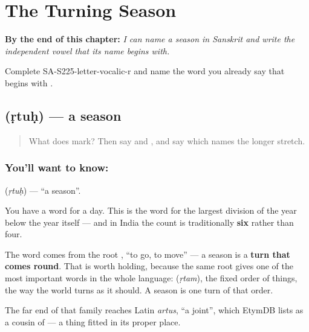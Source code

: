 
\chapter{The Turning Season}
\label{ch:sa-the-turning-season}

\begin{chapteropening}
\textbf{By the end of this chapter:} \emph{I can name a season in Sanskrit and write the independent vowel  that its name begins with.}

Complete SA-S225-letter-vocalic-r and name the word you already say that begins with .
\end{chapteropening}

\section[\texorpdfstring{\sk{ऋतुः} (ṛtuḥ)}{ऋतुः (ṛtuḥ)}]{ (ṛtuḥ) — a season}

\label{lesson:SA-C61-rtu}



\begin{quote}
What does \textbf{} mark? Then say \textbf{} and \textbf{}, and say which names the longer stretch.
\end{quote}

\subsection*{You'll want to know: }
\textbf{} (\emph{ṛtuḥ}) — \textquotedblleft{}a season\textquotedblright{}.

You have a word for a day. This is the word for the largest division of the year below the year itself — and in India the count is traditionally \textbf{six} rather than four.

The word comes from the root \textbf{}, \textquotedblleft{}to go, to move\textquotedblright{} — a season is a \textbf{turn that comes round}. That is worth holding, because the same root gives one of the most important words in the whole language: \textbf{} (\emph{ṛtam}), the fixed order of things, the way the world turns as it should. A season is one turn of that order.

The far end of that family reaches Latin \emph{artus}, \textquotedblleft{}a joint\textquotedblright{}, which EtymDB lists as a cousin of \textbf{} — a thing fitted in its proper place.

